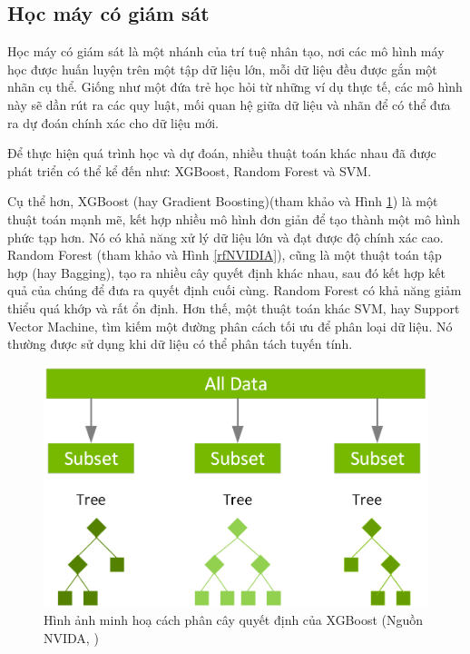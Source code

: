 \subsection{Học máy có giám sát}
Học máy có giám sát là một nhánh của trí tuệ nhân tạo, nơi các mô hình máy học được huấn luyện trên một tập dữ liệu lớn, mỗi dữ liệu đều được gắn một nhãn cụ thể. Giống như một đứa trẻ học hỏi từ những ví dụ thực tế, các mô hình này sẽ dần rút ra các quy luật, mối quan hệ giữa dữ liệu và nhãn để có thể đưa ra dự đoán chính xác cho dữ liệu mới.

Để thực hiện quá trình học và dự đoán, nhiều thuật toán khác nhau đã được phát triển có thể kể đến như: XGBoost, Random Forest và SVM.

Cụ thể hơn, XGBoost (hay Gradient Boosting)(tham khảo \cite{xgb,xgbNVIDIA}  và Hình \ref{XGBoost}) là một thuật toán mạnh mẽ, kết hợp nhiều mô hình đơn giản để tạo thành một mô hình phức tạp hơn. Nó có khả năng xử lý dữ liệu lớn và đạt được độ chính xác cao. Random Forest (tham khảo \cite{rf,rf_NVIDIA} và Hình \ref{rfNVIDIA}), cũng là một thuật toán tập hợp (hay Bagging), tạo ra nhiều cây quyết định khác nhau, sau đó kết hợp kết quả của chúng để đưa ra quyết định cuối cùng. Random Forest có khả năng giảm thiểu quá khớp và rất ổn định. Hơn thế, một thuật toán khác SVM, hay Support Vector Machine, tìm kiếm một đường phân cách tối ưu để phân loại dữ liệu. Nó thường được sử dụng khi dữ liệu có thể phân tách tuyến tính.
\begin{figure}[!ht]
    \centering
    \includegraphics[width=0.8\linewidth]{XGboost.png}
    \caption{Hình ảnh minh hoạ cách phân cây quyết định của XGBoost (Nguồn NVIDA, \cite{xgbNVIDIA})}
    \label{XGBoost}
\end{figure}
